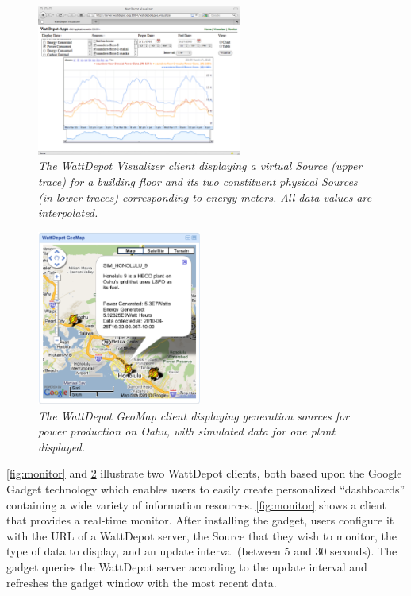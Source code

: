 \documentclass[conference]{IEEEtran}
\begin{document}
\begin{figure}[!th]
  \center
  \includegraphics[width=0.6\textwidth]{visualizer.eps}
  \caption{\em \small The WattDepot Visualizer client displaying a virtual Source
    (upper trace) for a building floor and its two constituent physical Sources
    (in lower traces) corresponding to energy meters. All data values are
    interpolated.}
  \label{fig:visualizer}
\end{figure} 

\begin{figure}[thb]
  \center
  \includegraphics[width=0.48\textwidth]{geomap.eps}
  \caption{\em \small The WattDepot GeoMap client displaying generation sources 
  for power production on Oahu, with simulated data for one plant displayed.}
  \label{fig:geomap}
\end{figure}

\figurename \ref{fig:monitor} and \figurename \ref{fig:geomap} illustrate two
WattDepot clients, both based upon the Google Gadget technology which
enables users to easily create personalized ``dashboards'' containing a
wide variety of information resources.  \figurename \ref{fig:monitor} shows a
client that provides a real-time monitor.  After installing the gadget, users
configure it with the URL of a WattDepot server, the Source that they wish
to monitor, the type of data to display, and an update interval (between 5
and 30 seconds).  The gadget queries the WattDepot server according to the
update interval and refreshes the gadget window with the most recent data.
\end{document}
